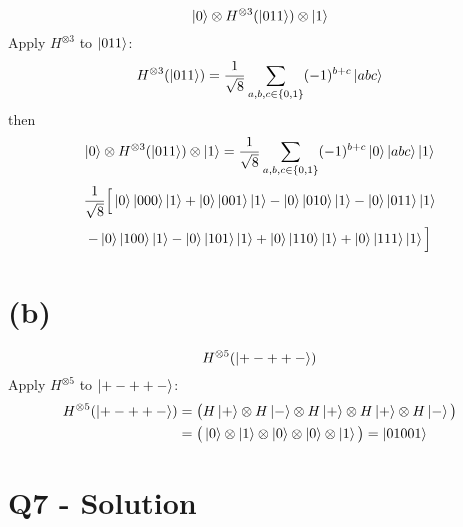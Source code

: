 \documentclass{article}
\begin{document}
\[
\ket{0} \otimes H^{\otimes 3}(\ket{011}) \otimes \ket{1}
\]
Apply \( H^{\otimes 3} \) to \( \ket{011} \):
\[
H^{\otimes 3}(\ket{011}) = \frac{1}{\sqrt{8}} \sum_{a,b,c \in \{0,1\}} (-1)^{b+c} \ket{abc}
\]
then
\[
\ket{0} \otimes H^{\otimes 3}(\ket{011}) \otimes \ket{1} = \frac{1}{\sqrt{8}} \sum_{a,b,c \in \{0,1\}} (-1)^{b+c} \ket{0} \ket{abc} \ket{1}
\]
\[
\frac{1}{\sqrt{8}} \Big[
\ket{0}\ket{000}\ket{1} + \ket{0}\ket{001}\ket{1} - \ket{0}\ket{010}\ket{1} - \ket{0}\ket{011}\ket{1} 
\]
\[
- \ket{0}\ket{100}\ket{1} - \ket{0}\ket{101}\ket{1} + \ket{0}\ket{110}\ket{1} + \ket{0}\ket{111}\ket{1}
\Big]
\]

\section*{(b)}

\[
H^{\otimes 5}(\ket{+-++-})
\]
Apply \( H^{\otimes 5} \) to \( \ket{+-++-} \):
\begin{align*}
   H^{\otimes 5}(\ket{+-++-}) &= \big(H\ket{+} \otimes H\ket{-} \otimes H\ket{+} \otimes H\ket{+} \otimes H\ket{-}\big) \\
   &= \big(\ket{0} \otimes \ket{1} \otimes \ket{0} \otimes \ket{0} \otimes \ket{1}\big) = \ket{01001}
\end{align*}

\section*{Q7 - Solution}
\end{document}
